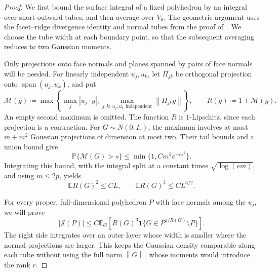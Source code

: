 \documentclass[11pt,letterpaper]{article}
\theoremstyle{remark}
\newcommand{\E}{\mathbb E}
\newcommand{\Pp}{\mathbb P}
\newcommand{\norm}[1]{\left\lVert#1\right\rVert}
\newcommand{\ind}{\mathbf 1}
\newcommand{\surf}{\mathcal J}
\begin{document}
\begin{proof}
We first bound the surface integral of a fixed polyhedron by an integral
over short outward tubes, and then average over \(V_0\). The geometric
argument uses the facet--ridge divergence identity and normal tubes
from the proof of~\cite[Proposition~4]{GaoZhang}. We choose the tube
width at each boundary point, so that the subsequent averaging reduces
to two Gaussian moments.

Only projections onto face normals and planes spanned by pairs of face normals
will be needed. For linearly independent \(u_j,u_k\), let \(\Pi_{jk}\)
be orthogonal projection onto \(\operatorname{span}(u_j,u_k)\), and put
\begin{equation}
 \mathcal M(g)\coloneqq \max\left\{\max_j|u_j\cdot g|,
       \max_{j,k:\,u_j,u_k\text{ independent}}\norm{\Pi_{jk}g}\right\},
 \qquad R(g)\coloneqq 1+\mathcal M(g).
 \label{appx-an:projection-radius}
\end{equation}
An empty second maximum is omitted. The function \(R\) is
\(1\)-Lipschitz, since each projection is a contraction. For
\(G\sim N(0,I_r)\), the maximum involves at most \(m+m^2\)
Gaussian projections of dimension at most two. Their tail bounds and
a union bound give
\[
 \Pp\{\mathcal M(G)>s\}\le\min\{1,Cm^2e^{-cs^2}\}.
\]
Integrating this bound, with the integral split at a constant times
\(\sqrt{\log(em)}\), and using \(m\le2p\), yields
\begin{equation}
 \E R(G)^2\le CL,\qquad \E R(G)^3\le CL^{3/2}.
 \label{appx-an:projection-moments}
\end{equation}

For every proper, full-dimensional polyhedron \(P\) with face normals among
the \(u_j\), we will prove
\begin{equation}
 |\surf(P)|\le C\E_G\left[R(G)^3
       \ind\{G\in P^{1/R(G)}\setminus P\}\right].
 \label{appx-an:adaptive-tubes}
\end{equation}
The right side integrates over an outer layer whose width is smaller
where the normal projections are larger. This keeps the Gaussian
density comparable along each tube without using the full norm
\(\norm G\), whose moments would introduce the rank \(r\).


\end{proof}
\end{document}
